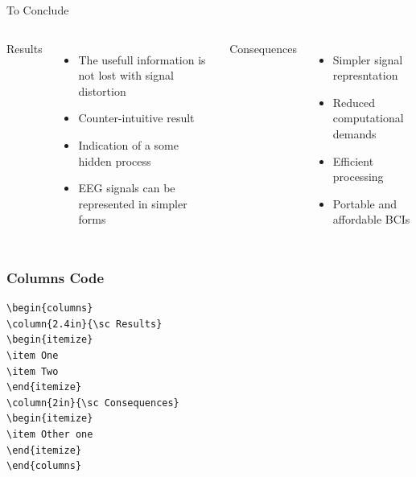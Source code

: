 \documentclass[12pt]{beamer}
\begin{document}
\begin{frame}{\sc To Conclude}

\begin{columns}

\column{2.4in}
{\sc Results}
\begin{itemize}
\item The usefull information is not lost with signal distortion 
\item Counter-intuitive result
\item Indication of a some hidden process
\item EEG signals can be represented in simpler forms 
\end{itemize}

\column{2in}
{\sc Consequences}
\begin{itemize}
\item Simpler signal represntation 
\item Reduced computational demands
\item Efficient processing 
\item Portable and affordable BCIs
\end{itemize}

\end{columns}

\end{frame}



\begin{frame}[fragile]
\frametitle{\sc Columns Code}


\begin{lstlisting}
\begin{columns}
\column{2.4in}{\sc Results}
\begin{itemize}
\item One
\item Two
\end{itemize}
\column{2in}{\sc Consequences}
\begin{itemize}
\item Other one
\end{itemize}
\end{columns}


\end{lstlisting}


\end{frame}

\end{document}
